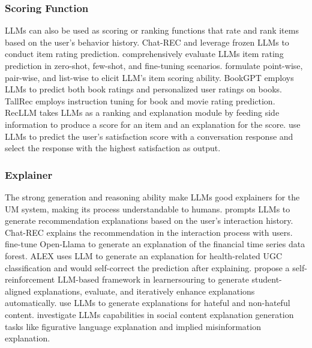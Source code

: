 \documentclass[11pt]{article}
\begin{document}
\subsubsection{Scoring Function}
LLMs can also be used as scoring or ranking functions that rate and rank items based on the user's behavior history. Chat-REC \cite{gao2023chat} and \citet{liu2023chatgpt} leverage frozen LLMs to conduct item rating prediction. \citet{kang2023llms} comprehensively evaluate LLMs item rating prediction in zero-shot, few-shot, and fine-tuning scenarios. \citet{dai2023uncovering} formulate point-wise, pair-wise, and list-wise to elicit LLM's item scoring ability. BookGPT \cite{zhiyuli2023bookgpt} employs LLMs to predict both book ratings and personalized user ratings on books. TallRec \cite{bao2023tallrec} employs instruction tuning for book and movie rating prediction. RecLLM \cite{friedman2023leveraging} takes LLMs as a ranking and explanation module by feeding side information to produce a score for an item and an explanation for the score. \citet{hu2023unlocking} use LLMs to predict the user's satisfaction score with a conversation response and select the response with the highest satisfaction as output.

\subsubsection{Explainer}
The strong generation and reasoning ability make LLMs good explainers for the UM system, making its process understandable to humans. 
\citet{liu2023chatgpt} prompts LLMs to generate recommendation explanations based on the user's interaction history. Chat-REC \cite{gao2023chat} explains the recommendation in the interaction process with users. \citet{yu2023temporal} fine-tune Open-Llama to generate an explanation of the financial time series data forest. ALEX \cite{jiang2023balanced} uses LLM to generate an explanation for health-related UGC classification and would self-correct the prediction after explaining. \citet{bao2023exploring} propose a self-reinforcement LLM-based framework in learnersouring to generate student-aligned explanations, evaluate, and iteratively enhance explanations automatically. \citet{wang2023evaluating} use LLMs to generate explanations for hateful and non-hateful content. \citet{ziems2023can} investigate LLMs capabilities in social content explanation generation tasks like figurative language explanation and implied misinformation explanation.
\end{document}
